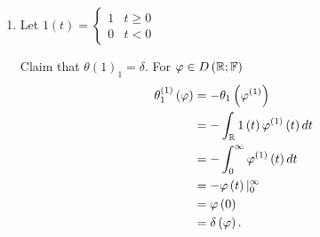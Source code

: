 \begin{eg}
	\begin{enumerate}
		\item Let $1\left( t \right) = \begin{cases}
				1 & t \ge 0 \\
				0 & t < 0
		\end{cases}$

		Claim that $\theta\left( 1 \right) _{1} = \delta$. For $\varphi \in  D\left( \mathbb{R}; \mathbb{F} \right) $ 
		\begin{align*}
			\theta ^{\left( 1 \right) }_{1}\left( \varphi \right) &= -\theta_{1}\left( \varphi^{\left( 1 \right) } \right)  \\
									      &= -\int_{\mathbb{R}}^{ } 1\left( t \right) \varphi^{\left( 1 \right) } \left( t \right) dt  \\
									      &= - \int_{0}^{\infty} \varphi^{\left( 1 \right) }\left( t \right) dt \\
									      &= -\varphi\left( t \right) | _{0}^{\infty} \\
									      &= \varphi\left( 0 \right)  \\
									      &= \delta\left( \varphi \right) 
		.\end{align*}


	\end{enumerate}
\end{eg}
